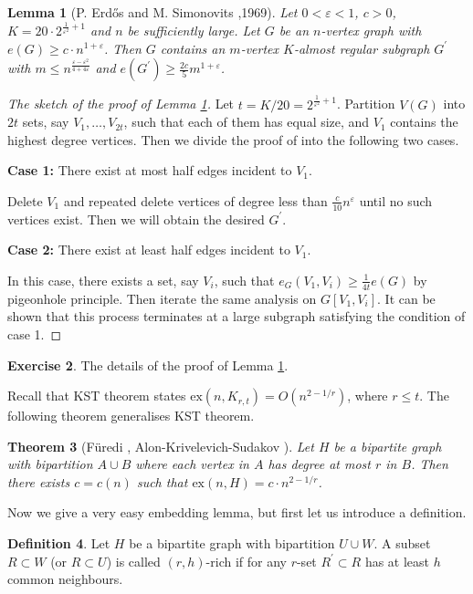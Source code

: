 \documentclass{article}
\newtheorem{theorem}{Theorem}[section]
\newtheorem{lemma}[theorem]{Lemma}
\theoremstyle{definition}
\newtheorem{definition}[theorem]{Definition}
\newtheorem{exercise}[theorem]{Exercise}
\newcommand{\ex}{\mathrm{ex}}
\def\Erdos{Erd\H{o}s}
\begin{document}
\begin{lemma}[P. \Erdos{} and M. Simonovits \cite{Erdos1969},1969]\label{regularization}
    Let $0<\varepsilon<1$, $c>0$, $K=20\cdot 2^{\frac{1}{\varepsilon^2}+1}$ and $n$ be sufficiently large. Let $G$ be an $n$-vertex graph with $e(G)\geq c \cdot n^{1+\varepsilon}$. Then $G$ contains an $m$-vertex $K$-almost regular subgraph $G^\prime$ with $m\leq n^{\frac{\varepsilon-\varepsilon^2}{4+4\varepsilon}}$ and $e(G^\prime)\geq \frac{2c}{5}m^{1+\varepsilon}$. 
\end{lemma}

\begin{proof}[The sketch of the proof of Lemma  \ref{regularization}]
  Let $t=K/20=2^{\frac{1}{\varepsilon^2}+1}$. Partition $V(G)$ into $2t$ sets, say $V_1,\ldots, V_{2t}$, such that each of them has  equal size, and $V_1$ contains the highest degree vertices. Then we divide the proof of into the following two cases. 

 \textbf{Case 1:} There exist at most half edges incident to $V_1$.

Delete  $V_1$ and repeated delete vertices of degree less than $\frac{c}{10}n^{\varepsilon}$ until no such vertices exist. Then we will obtain the desired $G^\prime$.

  \textbf{Case 2:} There exist at least half edges incident to $V_1$.

In this case,  there exists a set, say  $V_i$,  such that $e_{G}(V_1,V_i)\geq \frac{1}{4t}e(G)$  by pigeonhole principle. Then iterate the same analysis on $G[V_1,V_i]$. It can be shown that this process terminates at a large subgraph satisfying the condition of case 1.  
\end{proof}

\begin{exercise}
    The details of the proof of Lemma  \ref{regularization}. 
\end{exercise}


Recall that KST theorem states $\ex(n,K_{r,t})=O(n^{2-1/r})$, where $r\leq t$. The following theorem generalises KST theorem.

\begin{theorem}[F\"{u}redi \cite{Furedi1991}, Alon-Krivelevich-Sudakov \cite{Alon2003}]\label{Alon}
    Let $H$ be a bipartite graph with bipartition $A\cup B$ where each vertex in $A$ has degree at most $r$ in $B$. Then there exists $c=c(n)$ such that $\ex(n,H)=c\cdot n^{2-1/r}$. 
\end{theorem}

Now we give a very easy embedding lemma, but first let us introduce a definition. 
\begin{definition}
 Let $H$ be a bipartite graph with bipartition $U\cup W$. A subset $R\subset W$ (or $R\subset U$) is called $(r,h)$-rich if for any $r$-set $R^\prime \subset R$ has at least $h$ common neighbours.  
\end{definition}
\end{document}
